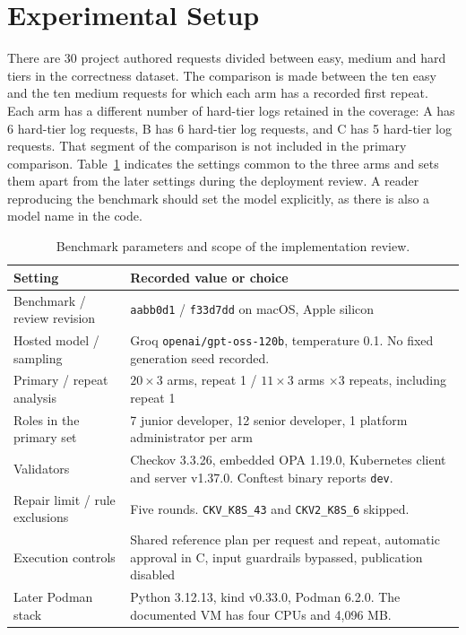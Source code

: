 \documentclass[12pt,onecolumn,draftclsnofoot]{IEEEtran}
\begin{document}
\section{Experimental Setup}
There are 30 project authored requests divided between easy, medium and hard tiers in the correctness dataset. The comparison is made between the ten easy and the ten medium requests for which each arm has a recorded first repeat. Each arm has a different number of hard-tier logs retained in the coverage: A has 6 hard-tier log requests, B has 6 hard-tier log requests, and C has 5 hard-tier log requests. That segment of the comparison is not included in the primary comparison. Table~\ref{tab:settings} indicates the settings common to the three arms and sets them apart from the later settings during the deployment review. A reader reproducing the benchmark should set the model explicitly, as there is also a model name in the code.

\begin{table}[htbp]\centering
\caption{Benchmark parameters and scope of the implementation review.}
\label{tab:settings}\small
\begin{tabular}{@{}p{.32\linewidth}p{.61\linewidth}@{}}\toprule
Setting & Recorded value or choice\\\midrule
Benchmark / review revision & \texttt{aabb0d1} / \texttt{f33d7dd} on macOS, Apple silicon\\
Hosted model / sampling & Groq \texttt{openai/gpt-oss-120b}, temperature 0.1. No fixed generation seed recorded.\\
Primary / repeat analysis & $20\times3$ arms, repeat 1 / $11\times3$ arms $\times3$ repeats, including repeat 1\\
Roles in the primary set & 7 junior developer, 12 senior developer, 1 platform administrator per arm\\
Validators & Checkov 3.3.26, embedded OPA 1.19.0, Kubernetes client and server v1.37.0. Conftest binary reports \texttt{dev}.\\
Repair limit / rule exclusions & Five rounds. \texttt{CKV\_K8S\_43} and \texttt{CKV2\_K8S\_6} skipped.\\
Execution controls & Shared reference plan per request and repeat, automatic approval in C, input guardrails bypassed, publication disabled\\
Later Podman stack & Python 3.12.13, kind v0.33.0, Podman 6.2.0. The documented VM has four CPUs and 4,096 MB.\\
\bottomrule\end{tabular}
\end{table}
\end{document}
